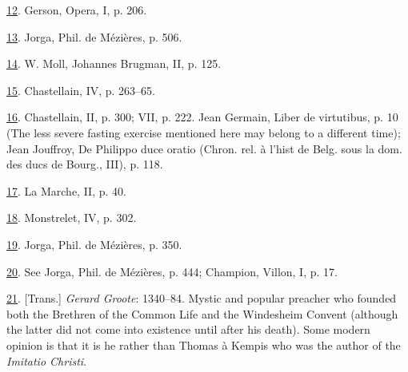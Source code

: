 \protect\hypertarget{23_NOTES.xhtmlux5cux23id_1001}{\protect\hyperlink{14_Chapter_Seven__THE_PIOUS_PERSONA.xhtmlux5cux23id_1000}{12}}.
Gerson, Opera, I, p. 206.

\protect\hypertarget{23_NOTES.xhtmlux5cux23id_999}{\protect\hyperlink{14_Chapter_Seven__THE_PIOUS_PERSONA.xhtmlux5cux23id_998}{13}}.
Jorga, Phil. de Mézières, p. 506.

\protect\hypertarget{23_NOTES.xhtmlux5cux23id_997}{\protect\hyperlink{14_Chapter_Seven__THE_PIOUS_PERSONA.xhtmlux5cux23id_996}{14}}.
W. Moll, Johannes Brugman, II, p. 125.

\protect\hypertarget{23_NOTES.xhtmlux5cux23id_995}{\protect\hyperlink{14_Chapter_Seven__THE_PIOUS_PERSONA.xhtmlux5cux23id_994}{15}}.
Chastellain, IV, p. 263--65.

\protect\hypertarget{23_NOTES.xhtmlux5cux23id_993}{\protect\hyperlink{14_Chapter_Seven__THE_PIOUS_PERSONA.xhtmlux5cux23id_992}{16}}.
Chastellain, II, p. 300; VII, p. 222. Jean Germain, Liber de virtutibus,
p. 10 (The less severe fasting exercise mentioned here may belong to a
different time); Jean Jouffroy, De Philippo duce oratio (Chron. rel. à
l'hist de Belg. sous la dom. des ducs de Bourg., III), p. 118.

\protect\hypertarget{23_NOTES.xhtmlux5cux23id_991}{\protect\hyperlink{14_Chapter_Seven__THE_PIOUS_PERSONA.xhtmlux5cux23id_990}{17}}.
La Marche, II, p. 40.

\protect\hypertarget{23_NOTES.xhtmlux5cux23id_989}{\protect\hyperlink{14_Chapter_Seven__THE_PIOUS_PERSONA.xhtmlux5cux23id_988}{18}}.
Monstrelet, IV, p. 302.

\protect\hypertarget{23_NOTES.xhtmlux5cux23id_987}{\protect\hyperlink{14_Chapter_Seven__THE_PIOUS_PERSONA.xhtmlux5cux23id_986}{19}}.
Jorga, Phil. de Mézières, p. 350.

\protect\hypertarget{23_NOTES.xhtmlux5cux23id_985}{\protect\hyperlink{14_Chapter_Seven__THE_PIOUS_PERSONA.xhtmlux5cux23id_984}{20}}.
See Jorga, Phil. de Mézières, p. 444; Champion, Villon, I, p. 17.

\protect\hypertarget{23_NOTES.xhtmlux5cux23id_983}{\protect\hyperlink{14_Chapter_Seven__THE_PIOUS_PERSONA.xhtmlux5cux23id_982}{21}}.
{[}Trans.{]} \emph{Gerard Groote}: 1340--84. Mystic and popular preacher
who founded both the Brethren of the Common Life and the Windesheim
Convent (although the latter did not come into existence until after his
death). Some modern opinion is that it is he rather than Thomas à Kempis
who was the author of the \emph{Imitatio Christi}.

